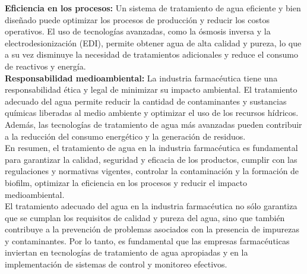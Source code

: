 \textbf{Eficiencia en los procesos:} Un sistema de tratamiento de agua eficiente y bien diseñado puede optimizar los procesos de producción y reducir los costos operativos. El uso de tecnologías avanzadas, como la ósmosis inversa y la electrodesionización (EDI), permite obtener agua de alta calidad y pureza, lo que a su vez disminuye la necesidad de tratamientos adicionales y reduce el consumo de reactivos y energía.\\

\textbf{Responsabilidad medioambiental:} La industria farmacéutica tiene una responsabilidad ética y legal de minimizar su impacto ambiental. El tratamiento adecuado del agua permite reducir la cantidad de contaminantes y sustancias químicas liberadas al medio ambiente y optimizar el uso de los recursos hídricos. Además, las tecnologías de tratamiento de agua más avanzadas pueden contribuir a la reducción del consumo energético y la generación de residuos.\\

En resumen, el tratamiento de agua en la industria farmacéutica es fundamental para garantizar la calidad, seguridad y eficacia de los productos, cumplir con las regulaciones y normativas vigentes, controlar la contaminación y la formación de biofilm, optimizar la eficiencia en los procesos y reducir el impacto medioambiental.\\

El tratamiento adecuado del agua en la industria farmacéutica no sólo garantiza que se cumplan los requisitos de calidad y pureza del agua, sino que también contribuye a la prevención de problemas asociados con la presencia de impurezas y contaminantes. Por lo tanto, es fundamental que las empresas farmacéuticas inviertan en tecnologías de tratamiento de agua apropiadas y en la implementación de sistemas de control y monitoreo efectivos.\\

